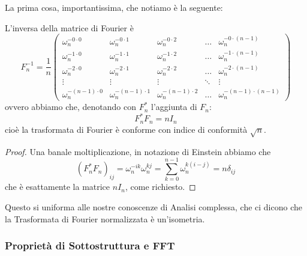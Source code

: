 \documentclass[11pt]{scrartcl}
\begin{document}
	La prima cosa, importantissima, che notiamo è la seguente:
	\begin{lemma}
		L'inversa della matrice di Fourier è
		$$F_n^{-1}=\frac{1}{n}
		\begin{pmatrix}
			\omega_n^{-0\cdot 0} & \omega_n^{-0\cdot 1} & \omega_n^{-0\cdot 2} & \dots & \omega_n^{-0\cdot (n-1)} \\
			\omega_n^{-1\cdot 0} & \omega_n^{-1\cdot 1} & \omega_n^{-1\cdot 2} & \dots & \omega_n^{-1\cdot (n-1)} \\ 
			\omega_n^{-2\cdot 0} & \omega_n^{-2\cdot 1} & \omega_n^{-2\cdot 2} & \dots & \omega_n^{-2\cdot (n-1)} \\
			\vdots & \vdots & \vdots & \ddots & \vdots \\
			\omega_{n}^{-(n-1)\cdot 0} & \omega_{n}^{-(n-1)\cdot 1} & \omega_{n}^{-(n-1)\cdot 2} & \dots & \omega_{n}^{-(n-1)\cdot(n-1)}
		\end{pmatrix}
		$$
		ovvero abbiamo che, denotando con $F_n^*$ l'aggiunta di $F_n$:
		$$F_n^*F_n=nI_n$$
		cioè la trasformata di Fourier è conforme con indice di conformità $\sqrt{n}$.
	\end{lemma}
	\begin{proof}
		Una banale moltiplicazione, in notazione di Einstein abbiamo che 
		$$(F_n^*F_n)_{ij}=\omega_n^{-ik}\omega_n^{kj}=\sum_{k=0}^{n-1}\omega_n^{k(i-j)}=n\delta_{ij}$$
		che è esattamente la matrice $nI_n$, come richiesto.
	\end{proof}
	
	Questo si uniforma alle nostre conoscenze di Analisi complessa, che ci dicono che la Trasformata di Fourier normalizzata è un'isometria.
	
	\subsubsection{Proprietà di Sottostruttura e FFT}
	
\end{document}
